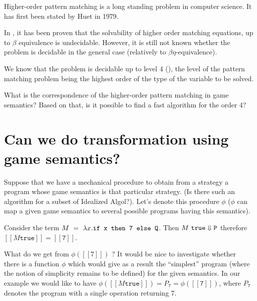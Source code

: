 \documentclass[10pt,twocolumn]{article}
\newcommand{\lsem}{[\![}
\newcommand{\rsem}{]\!]}
\def\sem#1{{\lsem #1 \rsem}}
\begin{document}
Higher-order pattern matching is a long standing problem in computer
science. It has first been stated by Huet in 1979.

In \cite{DBLP:journals/igpl/Loader03}, it has been proven that the
solvability of higher order matching equations, up to $\beta$
equivalence is undecidable. However, it is still not known whether
the problem is decidable in the general case (relatively to $\beta
\eta$-equivalence).

We know that the problem is decidable up to level 4 (\cite{HuPhD,
dowek92third,PaPhD}), the level of the pattern matching problem
being the highest order of the type of the variable to be solved.

What is the correspondence of the higher-order pattern matching in
game semantics? Based on that, is it possible to find a fast
algorithm for the order 4?


\section{Can we do transformation using game semantics?}

Suppose that we have a mechanical procedure to obtain from a
strategy a program whose game semantics is that particular strategy.
(Is there such an algorithm for a subset of Idealized Algol?). Let's
denote this procedure $\phi$ ($\phi$ can map a given game semantics
to several possible programs having this semantics).

Consider the term $M\ =\ \lambda x . \verb|if x then 7 else Q| $.
Then $M\ \verb|true| \Downarrow \verb|P|$ therefore $\sem{M
\texttt{true}} = \sem{\texttt{7}}$.

What do we get from $\phi (\sem{7} )$ ? It would be nice to
investigate whether there is a function $\phi$ which would give as a
result the ``simplest'' program (where the notion of simplicity
remains to be defined) for the given semantics. In our example we
would like to have $\phi ( \sem{M \texttt{true}} ) = P_{\texttt{7}}
= \phi (\sem{\texttt{7}})$, where $P_\texttt{7}$ denotes the program
with a single operation returning 7.



\end{document}

